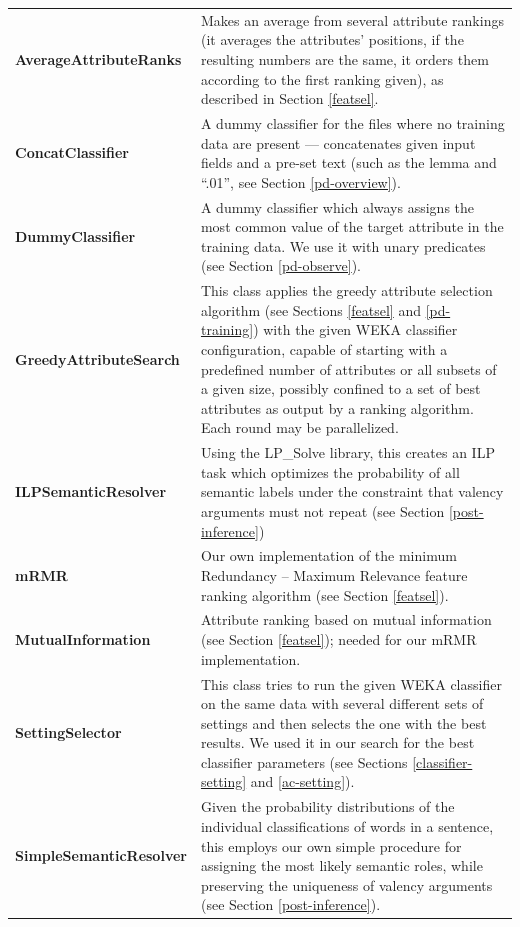 \documentclass[12pt,notitlepage,a4paper]{report}
\begin{document}
\footnotesize
\renewcommand{\arraystretch}{1.5}
\begin{longtable}{p{}p{}}
\bf AverageAttributeRanks & Makes an average from several attribute rankings (it averages the attributes' positions, if the resulting numbers are the same, it orders them according to the first ranking given), as described in Section \ref{featsel}. \\
\bf ConcatClassifier & A dummy classifier for the files where no training data are present --- concatenates given input fields and a pre-set text (such as the lemma and ``.01'', see Section \ref{pd-overview}). \\
\bf DummyClassifier & A dummy classifier which always assigns the most common value of the target attribute in the training data. We use it with unary predicates (see Section \ref{pd-observe}). \\
\bf GreedyAttributeSearch & This class applies the greedy attribute selection algorithm (see Sections \ref{featsel} and \ref{pd-training}) with the given WEKA classifier configuration, capable of starting with a predefined number of attributes or all subsets of a given size, possibly confined to a set of best attributes as output by a ranking algorithm. Each round may be parallelized. \\
\bf ILPSemanticResolver & Using the LP\_Solve library, this creates an ILP task which optimizes the probability of all semantic labels under the constraint that valency arguments must not repeat (see Section \ref{post-inference}) \\
\bf mRMR & Our own implementation of the minimum Redundancy -- Maximum Relevance feature ranking algorithm (see Section \ref{featsel}). \\
\bf MutualInformation & Attribute ranking based on mutual information (see Section \ref{featsel}); needed for our mRMR implementation. \\
\bf SettingSelector & This class tries to run the given WEKA classifier on the same data with several different sets of settings and then selects the one with the best results. We used it in our search for the best classifier parameters (see Sections \ref{classifier-setting} and \ref{ac-setting}). \\
\bf SimpleSemanticResolver & Given the probability distributions of the individual classifications of words in a sentence, this employs our own simple procedure for assigning the most likely semantic roles, while preserving the uniqueness of valency arguments (see Section \ref{post-inference}). \\

\end{longtable}
\end{document}
